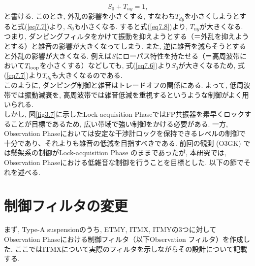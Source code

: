 \begin{equation}
S_0+T_{ny}=1, 
\label{eq7.8}
\end{equation}
と書ける. このとき, 外乱の影響を小さくする, すなわち$T_{dy}$を小さくしようとすると式(\ref{eq7.7})より, $S_0$も小さくなる. すると式(\ref{eq7.8})より, $T_{ny}$が大きくなる. \\
\quad つまり, ダンピングフィルタをかけて振動を抑えようとする（＝外乱を抑えようとする）と雑音の影響が大きくなってしまう. また, 逆に雑音を減らそうとすると外乱の影響が大きくなる. 例えば$S$にローパス特性を持たせる（＝高周波帯において$T_{\rm loop}$を小さくする）などしても, 式(\ref{eq7.6})より$S_0$が大きくなるため, 式(\ref{eq7.7})より$T_{dy}$も大きくなるのである. \\
\quad このように, ダンピング制御と雑音はトレードオフの関係にある. よって, 低周波帯では振動減衰を, 高周波帯では雑音低減を重視するというような制御がよく用いられる. \\
\quad しかし, 図\ref{fig3.7}に示したLock-acquisition PhaseではFP共振器を素早くロックすることが目標であるため, 広い帯域で強い制御をかける必要がある. 一方, Observation Phaseにおいては安定な干渉計ロックを保持できるレベルの制御で十分であり、それよりも雑音の低減を目指すべきである. 前回の観測 (O3GK) では懸架系の制御がLock-acquisition Phase のままであったが, 本研究では, Observation Phaseにおける低雑音な制御を行うことを目標とした. 以下の節でそれを述べる. 
\section{制御フィルタの変更}
まず, Type-A suspensionのうち, ETMY, ITMX, ITMYの3つに対してObservation Phaseにおける制御フィルタ（以下Observation フィルタ）を作成した. ここではITMXについて実際のフィルタを示しながらその設計について記載する.
